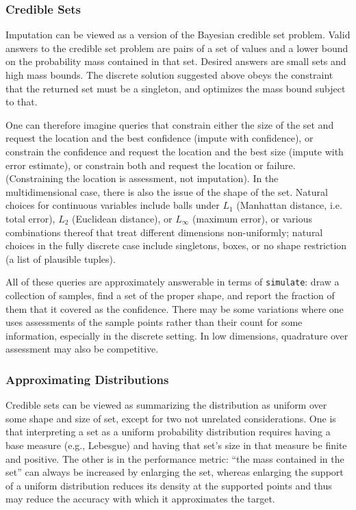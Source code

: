 \documentclass[10pt,letterpaper]{article}
\begin{document}
\subsubsection{Credible Sets}

Imputation can be viewed as a version of the Bayesian credible set
problem.  Valid answers to the credible set problem are pairs of a set
of values and a lower bound on the probability mass contained in that
set.  Desired answers are small sets and high mass bounds.  The
discrete solution suggested above obeys the constraint that the
returned set must be a singleton, and optimizes the mass bound subject
to that.

One can therefore imagine queries that constrain either the size of
the set and request the location and the best confidence (impute with
confidence), or constrain the confidence and request the location and
the best size (impute with error estimate), or constrain both and
request the location or failure.  (Constraining the location is
assessment, not imputation).  In the multidimensional case, there is
also the issue of the shape of the set.  Natural choices for
continuous variables include balls under $L_1$ (Manhattan distance,
i.e. total error), $L_2$ (Euclidean distance), or $L_\infty$ (maximum
error), or various combinations thereof that treat different
dimensions non-uniformly; natural choices in the fully discrete case
include singletons, boxes, or no shape restriction (a list of
plausible tuples).

All of these queries are approximately answerable in terms of
\texttt{simulate}: draw a collection of samples, find a set of the proper
shape, and report the fraction of them that it covered as the
confidence.  There may be some variations where one uses assessments
of the sample points rather than their count for some information,
especially in the discrete setting.  In low dimensions, quadrature
over assessment may also be competitive.

\subsubsection{Approximating Distributions}

Credible sets can be viewed as summarizing the distribution as uniform
over some shape and size of set, except for two not unrelated
considerations.  One is that interpreting a set as a uniform
probability distribution requires having a base measure (e.g.,
Lebesgue) and having that set's size in that measure be finite and
positive.  The other is in the performance metric: ``the mass
contained in the set'' can always be increased by enlarging the set,
whereas enlarging the support of a uniform distribution reduces its
density at the supported points and thus may reduce the accuracy with
which it approximates the target.
\end{document}
